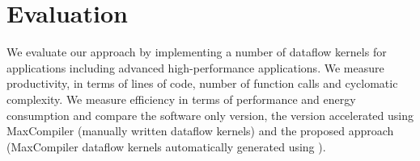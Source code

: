 \chapter{Evaluation}
\label{sec:evaluation}

We evaluate our approach by implementing a number of dataflow kernels
for applications including advanced high-performance applications. We
measure productivity, in terms of lines of code, number of function
calls and cyclomatic complexity. We measure efficiency in terms of
performance and energy consumption and compare the software only
version, the version accelerated using MaxCompiler (manually written
dataflow kernels) and the proposed approach (MaxCompiler dataflow
kernels automatically generated using \fastc{}).

\label{sec:benchmark}

